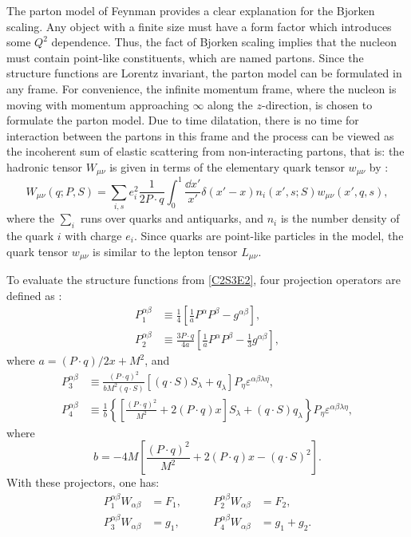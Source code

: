 The parton model of Feynman \cite{Feynman1969} provides a clear explanation for the Bjorken scaling. Any object with a finite size must have a form factor which introduces some $Q^2$ dependence. Thus, the fact of Bjorken scaling implies that the nucleon must contain point-like constituents, which are named partons. Since the structure functions are Lorentz invariant, the parton model can be formulated in any frame. For convenience, the infinite momentum frame, where the nucleon is moving with momentum approaching $\infty$ along the $z$-direction, is chosen to formulate the parton model. Due to time dilatation, there is no time for interaction between the partons in this frame and the process can be viewed as the incoherent sum of elastic scattering from non-interacting partons, that is: the hadronic tensor $W_{\mu\nu}$ is given in terms of the elementary quark tensor $w_{\mu\nu}$ by \cite{Leader1996}:
\begin{equation} \label{C2S3E2}
W_{\mu\nu}(q;P,S) = \sum_{i,s}e_i^2\frac{1}{2P\cdot q}\int_0^1\frac{\dd{x'}}{x'}\delta(x'-x)n_i(x',s;S)w_{\mu\nu}(x',q,s),
\end{equation}
where the $\sum_i$ runs over quarks and antiquarks, and $n_i$ is the number density of the quark $i$ with charge $e_i$. Since quarks are point-like particles in the model, the quark tensor $w_{\mu\nu}$ is similar to the lepton tensor $L_{\mu\nu}$.

To evaluate the structure functions from \cref{C2S3E2}, four projection operators are defined as \cite{Anselmino1995}:
\begin{align} \label{C2S3E3}
P_1^{\alpha\beta} & \equiv \frac{1}{4}\left[\frac{1}{a}P^\alpha P^\beta-g^{\alpha\beta}\right], \\ \label{C2S3E4}
P_2^{\alpha\beta} & \equiv \frac{3P\cdot q}{4a}\left[\frac{1}{a}P^\alpha P^\beta-\frac{1}{3}g^{\alpha\beta}\right],
\end{align}
where $a=(P\cdot q)/2x+M^2$, and
\begin{align} \label{C2S3E5}
P_3^{\alpha\beta} & \equiv \frac{(P\cdot q)^2}{bM^2(q\cdot S)}\left[(q\cdot S)S_\lambda+q_\lambda\right]P_\eta\varepsilon^{\alpha\beta\lambda\eta}, \\ \label{C2S3E6}
P_4^{\alpha\beta} & \equiv \frac{1}{b}\left\{\left[\frac{(P\cdot q)^2}{M^2}+2(P\cdot q)x\right]S_\lambda+(q\cdot S)q_\lambda\right\}P_\eta\varepsilon^{\alpha\beta\lambda\eta},
\end{align}
where
\begin{equation} \label{C2S3E7}
b = -4M\left[\frac{(P\cdot q)^2}{M^2}+2(P\cdot q)x-(q\cdot S)^2\right].
\end{equation}
With these projectors, one has:
\begin{equation} \label{C2S3E8}
\begin{aligned}
P_1^{\alpha\beta}W_{\alpha\beta} & = F_1, & \qquad P_2^{\alpha\beta}W_{\alpha\beta} & = F_2, \\
P_3^{\alpha\beta}W_{\alpha\beta} & = g_1, & \qquad P_4^{\alpha\beta}W_{\alpha\beta} & = g_1+g_2.
\end{aligned}
\end{equation}

